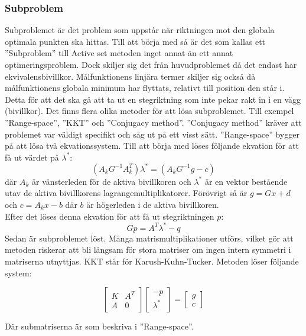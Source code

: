 \subsubsection{Subproblem}
Subproblemet är det problem som uppstår när riktningen mot den globala optimala punkten ska hittas. Till att börja med så är det som kallas ett ''Subproblem'' till Active set metoden inget annat än ett annat optimeringsproblem. Dock skiljer sig det från huvudproblemet då det endast har ekvivalensbivillkor. Målfunktionens linjära termer skiljer sig också då målfunktionens globala minimum har flyttats, relativt till position den står i. Detta för att det ska gå att ta ut en stegriktning som inte pekar rakt in i en vägg (bivillkor). \citep{numericaloptimization}
\newline
\newline
Det finns flera olika metoder för att lösa subproblemet.
Till exempel ''Range-space'', ''KKT'' och ''Conjugacy method''. ''Conjugacy method'' kräver att problemet var väldigt specifikt och såg ut på ett visst sätt. ''Range-space'' bygger på att lösa två ekvationssystem. Till att börja med löses följande ekvation för att få ut värdet på $\lambda^*$:
$$({A_k}G^{-1}A_k^T)\lambda^* = ({A_k}G^{-1}g-c)$$
där $A_k$ är vänsterleden för de aktiva bivillkoren och $\lambda^*$ är en vektor bestående utav de aktiva bivillkorens lagrangemultiplikatorer. Förövrigt så är
$g = Gx+d$ och $c = A_kx - b$ där $b$ är högerleden i de aktiva bivillkoren. \\ Efter det löses denna ekvation för att få ut stegriktningen $p$:
$$Gp = A^T\lambda^* - q$$
Sedan är subproblemet löst. Många matrismultiplikationer utförs, vilket gör att metoden riskerar att bli långsam för stora matriser om ingen intern symmetri i matriserna utnyttjas. \citep{numericaloptimization}
\newline
\newline
KKT står för Karush-Kuhn-Tucker. Metoden löser följande system:

$$\begin{bmatrix}
K & A^T \\
A & 0
\end{bmatrix}
\begin{bmatrix}
-p \\
\lambda^*
\end{bmatrix}
=
\begin{bmatrix}
g \\
c
\end{bmatrix}
$$

Där submatriserna är som beskriva i ''Range-space''\citep{numericaloptimization}.
